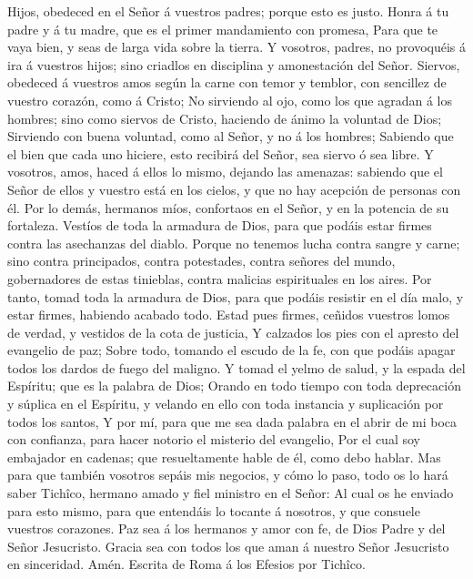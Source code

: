  Hijos, obedeced en el Señor á vuestros padres; porque
esto es justo.  Honra á tu padre y á tu madre, que es el
primer mandamiento con promesa,  Para que te vaya bien, y
seas de larga vida sobre la tierra.  Y vosotros, padres,
no provoquéis á ira á vuestros hijos; sino criadlos en disciplina y
amonestación del Señor.  Siervos, obedeced á vuestros amos
según la carne con temor y temblor, con sencillez de vuestro corazón,
como á Cristo;  No sirviendo al ojo, como los que agradan
á los hombres; sino como siervos de Cristo, haciendo de ánimo la
voluntad de Dios;  Sirviendo con buena voluntad, como al
Señor, y no á los hombres;  Sabiendo que el bien que cada
uno hiciere, esto recibirá del Señor, sea siervo ó sea libre.
 Y vosotros, amos, haced á ellos lo mismo, dejando las
amenazas: sabiendo que el Señor de ellos y vuestro está en los cielos, y
que no hay acepción de personas con él.  Por lo demás,
hermanos míos, confortaos en el Señor, y en la potencia de su fortaleza.
 Vestíos de toda la armadura de Dios, para que podáis
estar firmes contra las asechanzas del diablo.  Porque no
tenemos lucha contra sangre y carne; sino contra principados, contra
potestades, contra señores del mundo, gobernadores de estas tinieblas,
contra malicias espirituales en los aires.  Por tanto,
tomad toda la armadura de Dios, para que podáis resistir en el día malo,
y estar firmes, habiendo acabado todo.  Estad pues
firmes, ceñidos vuestros lomos de verdad, y vestidos de la cota de
justicia,  Y calzados los pies con el apresto del
evangelio de paz;  Sobre todo, tomando el escudo de la
fe, con que podáis apagar todos los dardos de fuego del maligno.
 Y tomad el yelmo de salud, y la espada del Espíritu; que
es la palabra de Dios;  Orando en todo tiempo con toda
deprecación y súplica en el Espíritu, y velando en ello con toda
instancia y suplicación por todos los santos,  Y por mí,
para que me sea dada palabra en el abrir de mi boca con confianza, para
hacer notorio el misterio del evangelio,  Por el cual soy
embajador en cadenas; que resueltamente hable de él, como debo hablar.
 Mas para que también vosotros sepáis mis negocios, y
cómo lo paso, todo os lo hará saber Tichîco, hermano amado y fiel
ministro en el Señor:  Al cual os he enviado para esto
mismo, para que entendáis lo tocante á nosotros, y que consuele vuestros
corazones.  Paz sea á los hermanos y amor con fe, de Dios
Padre y del Señor Jesucristo.  Gracia sea con todos los
que aman á nuestro Señor Jesucristo en sinceridad. Amén. Escrita de Roma
á los Efesios por Tichîco.
